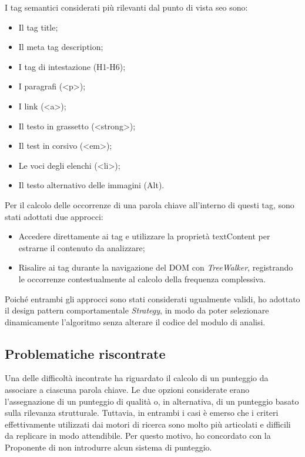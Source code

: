 \vspace{10pt}
\par\noindent I tag semantici considerati più rilevanti dal punto di vista \gls{seo} sono:
\begin{itemize}
  \item Il tag title;
  \item Il meta tag description;
  \item I tag di intestazione (H1-H6);
  \item I paragrafi (<p>);
  \item I link (<a>);
  \item Il testo in grassetto (<strong>);
  \item Il test in corsivo (<em>);
  \item Le voci degli elenchi (<li>);
  \item Il testo alternativo delle immagini (Alt).
\end{itemize}

\vspace{5pt}
\par\noindent Per il calcolo delle occorrenze di una parola chiave all’interno di questi tag, sono stati adottati due approcci:
\begin{itemize}
  \item Accedere direttamente ai tag e utilizzare la proprietà textContent per estrarne il contenuto da analizzare;
  \item Risalire ai tag durante la navigazione del DOM con \textit{TreeWalker}, registrando le occorrenze contestualmente al calcolo della frequenza complessiva.
\end{itemize}

\vspace{5pt}
\par\noindent Poiché entrambi gli approcci sono stati considerati ugualmente validi, ho adottato il design pattern comportamentale \textit{Strategy}, in modo da poter selezionare dinamicamente l’algoritmo senza alterare il codice del modulo di analisi.

\subsection{Problematiche riscontrate}

\par Una delle difficoltà incontrate ha riguardato il calcolo di un punteggio da associare a ciascuna parola chiave. Le due opzioni considerate erano l’assegnazione di un punteggio di qualità o, in alternativa, di un punteggio basato sulla rilevanza strutturale. Tuttavia, in entrambi i casi è emerso che i criteri effettivamente utilizzati dai motori di ricerca sono molto più articolati e difficili da replicare in modo attendibile. Per questo motivo, ho concordato con la Proponente di non introdurre alcun sistema di punteggio.


